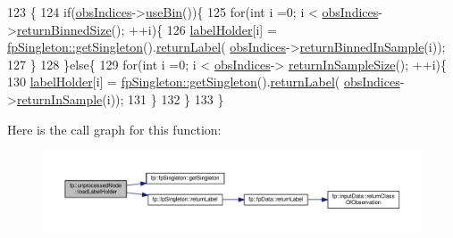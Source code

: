 \begin{DoxyCode}
123                                              \{
124                     \textcolor{keywordflow}{if}(\hyperlink{classfp_1_1unprocessedNode_aba9f03124658f62906fa8ded53cef535}{obsIndices}->\hyperlink{classfp_1_1stratifiedInNodeClassIndices_af740a8054cefe977f8f1288fc6b39109}{useBin}())\{
125                         \textcolor{keywordflow}{for}(\textcolor{keywordtype}{int} i =0; i < \hyperlink{classfp_1_1unprocessedNode_aba9f03124658f62906fa8ded53cef535}{obsIndices}->\hyperlink{classfp_1_1stratifiedInNodeClassIndices_a9f77fe5e638170c4ad4ce99541561cfc}{returnBinnedSize}(); ++i)\{
126                             \hyperlink{classfp_1_1unprocessedNode_a2aa2f9dcba0b0a859457ed22e147f698}{labelHolder}[i] = 
      \hyperlink{classfp_1_1fpSingleton_a8bdae77b68521003e3fc630edec2e240}{fpSingleton::getSingleton}().\hyperlink{classfp_1_1fpSingleton_aa2f644b1521948fb994f4087ddfaea14}{returnLabel}(
      \hyperlink{classfp_1_1unprocessedNode_aba9f03124658f62906fa8ded53cef535}{obsIndices}->\hyperlink{classfp_1_1stratifiedInNodeClassIndices_a775d9a820b6f48ab44cd1ac4ffde1578}{returnBinnedInSample}(i));
127                         \}
128                     \}\textcolor{keywordflow}{else}\{
129                         \textcolor{keywordflow}{for}(\textcolor{keywordtype}{int} i =0; i < \hyperlink{classfp_1_1unprocessedNode_aba9f03124658f62906fa8ded53cef535}{obsIndices}->
      \hyperlink{classfp_1_1stratifiedInNodeClassIndices_a596235ffec7250fabd2818d395b39c66}{returnInSampleSize}(); ++i)\{
130                             \hyperlink{classfp_1_1unprocessedNode_a2aa2f9dcba0b0a859457ed22e147f698}{labelHolder}[i] = 
      \hyperlink{classfp_1_1fpSingleton_a8bdae77b68521003e3fc630edec2e240}{fpSingleton::getSingleton}().\hyperlink{classfp_1_1fpSingleton_aa2f644b1521948fb994f4087ddfaea14}{returnLabel}(
      \hyperlink{classfp_1_1unprocessedNode_aba9f03124658f62906fa8ded53cef535}{obsIndices}->\hyperlink{classfp_1_1stratifiedInNodeClassIndices_a2d7e802fb97db0367bb8e8f31d393afd}{returnInSample}(i));
131                         \}
132                     \}
133                 \}
\end{DoxyCode}
Here is the call graph for this function\+:
\nopagebreak
\begin{figure}[H]
\begin{center}
\leavevmode
\includegraphics[width=350pt]{classfp_1_1unprocessedNode_a7b286c437f8f73fb3431358c11898a82_cgraph}
\end{center}
\end{figure}
\mbox{\label{classfp_1_1unprocessedNode_a0236d2722cb4c32b8ff7e66fc118bed2}} 
